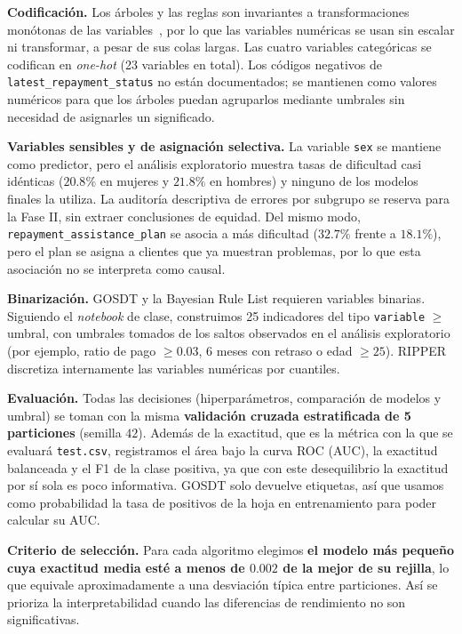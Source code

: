 \documentclass[a4paper,11pt]{article}
\begin{document}
\textbf{Codificación.} Los árboles y las reglas son invariantes a transformaciones monótonas de las variables~\cite{slidesLogical}, por lo que las variables numéricas se usan sin escalar ni transformar, a pesar de sus colas largas. Las cuatro variables categóricas se codifican en \textit{one-hot} (23 variables en total). Los códigos negativos de \texttt{latest\_repayment\_status} no están documentados; se mantienen como valores numéricos para que los árboles puedan agruparlos mediante umbrales sin necesidad de asignarles un significado.

\textbf{Variables sensibles y de asignación selectiva.} La variable \texttt{sex} se mantiene como predictor, pero el análisis exploratorio muestra tasas de dificultad casi idénticas ($20.8\%$ en mujeres y $21.8\%$ en hombres) y ninguno de los modelos finales la utiliza. La auditoría descriptiva de errores por subgrupo se reserva para la Fase II, sin extraer conclusiones de equidad. Del mismo modo, \texttt{repayment\_assistance\_plan} se asocia a más dificultad ($32.7\%$ frente a $18.1\%$), pero el plan se asigna a clientes que ya muestran problemas, por lo que esta asociación no se interpreta como causal.

\textbf{Binarización.} GOSDT y la Bayesian Rule List requieren variables binarias. Siguiendo el \textit{notebook} de clase, construimos 25 indicadores del tipo \texttt{variable} $\geq$ umbral, con umbrales tomados de los saltos observados en el análisis exploratorio (por ejemplo, ratio de pago $\geq 0.03$, 6 meses con retraso o edad $\geq 25$). RIPPER discretiza internamente las variables numéricas por cuantiles.

\textbf{Evaluación.} Todas las decisiones (hiperparámetros, comparación de modelos y umbral) se toman con la misma \textbf{validación cruzada estratificada de 5 particiones} (semilla $42$). Además de la exactitud, que es la métrica con la que se evaluará \texttt{test.csv}, registramos el área bajo la curva ROC (AUC), la exactitud balanceada y el F1 de la clase positiva, ya que con este desequilibrio la exactitud por sí sola es poco informativa. GOSDT solo devuelve etiquetas, así que usamos como probabilidad la tasa de positivos de la hoja en entrenamiento para poder calcular su AUC.

\textbf{Criterio de selección.} Para cada algoritmo elegimos \textbf{el modelo más pequeño cuya exactitud media esté a menos de $0.002$ de la mejor de su rejilla}, lo que equivale aproximadamente a una desviación típica entre particiones. Así se prioriza la interpretabilidad cuando las diferencias de rendimiento no son significativas.
\end{document}
